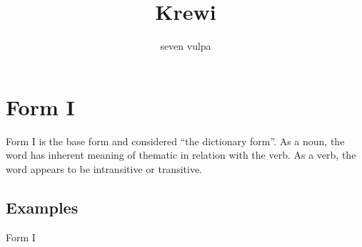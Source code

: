 \documentclass{article}
\title{Krewi}
\author{seven vulpa}
\begin{document}
\maketitle

% 

% 
% 
% 

\section{Form I}
Form I is the base form and considered ``the dictionary form''. As a noun, the word has inherent meaning of thematic in relation with the verb. As a verb, the word appears to be intransitive or transitive.

\subsection{Examples}
Form I



\end{document}
